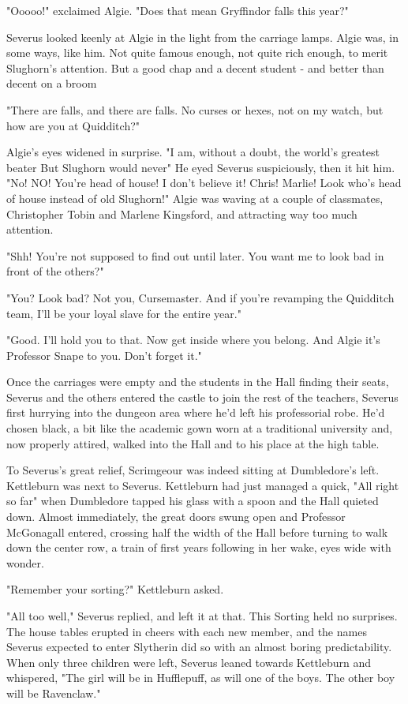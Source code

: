 "Ooooo!" exclaimed Algie. "Does that mean Gryffindor falls this year?"

Severus looked keenly at Algie in the light from the carriage lamps. Algie was, in some ways, like him. Not quite famous enough, not quite rich enough, to merit Slughorn's attention. But a good chap and a decent student - and better than decent on a broom{\el}

"There are falls, and there are falls. No curses or hexes, not on my watch, but how are you at Quidditch?"

Algie's eyes widened in surprise. "I am, without a doubt, the world's greatest beater{\el} But Slughorn would never{\el}" He eyed Severus suspiciously, then it hit him. "No! NO! You're head of house! I don't believe it! Chris! Marlie! Look who's head of house instead of old Slughorn!" Algie was waving at a couple of classmates, Christopher Tobin and Marlene Kingsford, and attracting way too much attention.

"Shh! You're not supposed to find out until later. You want me to look bad in front of the others?"

"You? Look bad? Not you, Cursemaster. And if you're revamping the Quidditch team, I'll be your loyal slave for the entire year."

"Good. I'll hold you to that. Now get inside where you belong. And Algie{\el} it's Professor Snape to you. Don't forget it."

Once the carriages were empty and the students in the Hall finding their seats, Severus and the others entered the castle to join the rest of the teachers, Severus first hurrying into the dungeon area where he'd left his professorial robe. He'd chosen black, a bit like the academic gown worn at a traditional university and, now properly attired, walked into the Hall and to his place at the high table.

To Severus's great relief, Scrimgeour was indeed sitting at Dumbledore's left. Kettleburn was next to Severus. Kettleburn had just managed a quick, "All right so far" when Dumbledore tapped his glass with a spoon and the Hall quieted down. Almost immediately, the great doors swung open and Professor McGonagall entered, crossing half the width of the Hall before turning to walk down the center row, a train of first years following in her wake, eyes wide with wonder.

"Remember your sorting?" Kettleburn asked.

"All too well," Severus replied, and left it at that. This Sorting held no surprises. The house tables erupted in cheers with each new member, and the names Severus expected to enter Slytherin did so with an almost boring predictability. When only three children were left, Severus leaned towards Kettleburn and whispered, "The girl will be in Hufflepuff, as will one of the boys. The other boy will be Ravenclaw."

